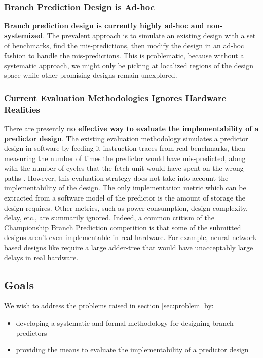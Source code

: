 \documentclass[conference]{IEEEtran}
\begin{document}
\subsubsection{Branch Prediction Design is Ad-hoc}
 \textbf{Branch prediction design is currently highly ad-hoc and non-systemized}. The prevalent approach is to simulate an existing design with a set of benchmarks, find the mis-predictions, then modify the design in an ad-hoc fashion to handle the mis-predictions. This is problematic, because without a systematic approach, we might only be picking at localized regions of the design space while other promising designs remain unexplored. 

\subsubsection{Current Evaluation Methodologies Ignores Hardware Realities}
There are presently \textbf{no effective way to evaluate the implementability of a predictor design}. The existing evaluation methodology simulates a predictor design in software by feeding it instruction traces from real benchmarks, then measuring the number of times the predictor would have mis-predicted, along with the number of cycles that the fetch unit would have spent on the wrong paths \cite{championship}. However, this evaluation strategy does not take into account the implementability of the design. The only implementation metric which can be extracted from a software model of the predictor is the amount of storage the design requires. Other metrics, such as power consumption, design complexity, delay, etc., are summarily ignored. Indeed, a common critism of the Championship Branch Prediction competition is that some of the submitted designs aren't even implementable in real hardware. For example, neural network based designs like \cite{Lin01} require a large adder-tree that would have unacceptably large delays in real hardware. 

\subsection{Goals}
We wish to address the problems raised in section \ref{sec:problem} by:
\begin{itemize}
  \item developing a systematic and formal methodology for designing branch predictors
  \item providing the means to evaluate the implementability of a predictor design 
\end{itemize} 
\end{document}
